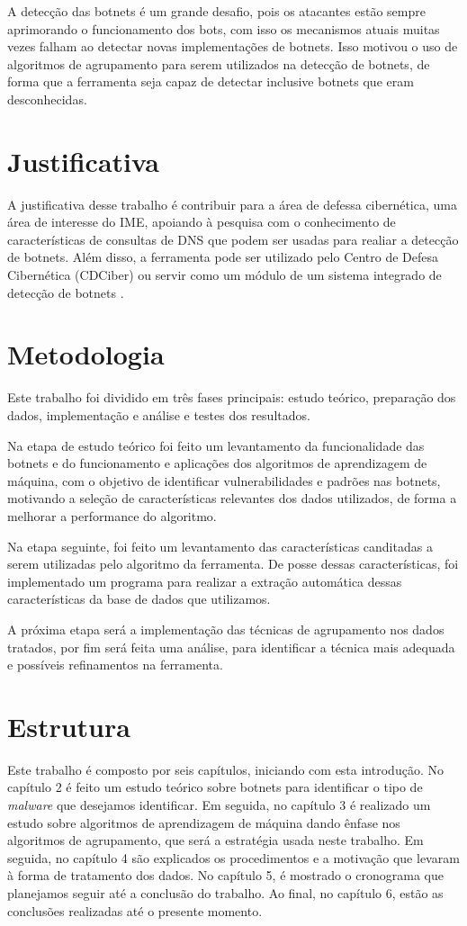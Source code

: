 A detecção das botnets é um grande desafio, pois os atacantes estão sempre aprimorando o funcionamento dos bots, com isso os mecanismos atuais muitas vezes falham ao detectar novas implementações de botnets. Isso motivou o uso de algoritmos de agrupamento para serem utilizados na detecção de botnets, de forma que a ferramenta seja capaz de detectar inclusive botnets que eram desconhecidas. 

\section{Justificativa}
A justificativa desse trabalho é contribuir para a área de defessa cibernética, uma área de interesse do IME, apoiando à pesquisa com o conhecimento de características de consultas de DNS que podem ser usadas para realiar a detecção de botnets. Além disso, a ferramenta pode ser utilizado pelo Centro de Defesa Cibernética (CDCiber) ou servir como um módulo de um sistema integrado de detecção de botnets \citep{silva2012arquitetura}.

\section{Metodologia}
Este trabalho foi dividido em três fases principais: estudo teórico, preparação dos dados, implementação e análise e testes dos resultados. 

Na etapa de estudo teórico foi feito um levantamento da funcionalidade das botnets e do funcionamento e aplicações dos algoritmos de aprendizagem de máquina, com o objetivo de identificar vulnerabilidades e padrões nas botnets, motivando a seleção de características relevantes dos dados utilizados, de forma a melhorar a performance do algoritmo.

Na etapa seguinte, foi feito um levantamento das características canditadas a serem utilizadas pelo algoritmo da ferramenta. De posse dessas características, foi implementado um programa para realizar a extração automática dessas características da base de dados que utilizamos.

A próxima etapa será a implementação das técnicas de agrupamento nos dados tratados, por fim será feita uma análise, para identificar a técnica mais adequada e possíveis refinamentos na ferramenta.

\section{Estrutura}
Este trabalho é composto por seis capítulos, iniciando com esta introdução. No capítulo 2 é feito um estudo teórico sobre botnets para identificar o tipo de \textit{malware} que desejamos identificar. Em seguida, no capítulo 3 é realizado um estudo sobre algoritmos de aprendizagem de máquina dando ênfase nos algoritmos de agrupamento, que será a estratégia usada neste trabalho. Em seguida, no capítulo 4 são explicados os procedimentos e a motivação que levaram à forma de tratamento dos dados. No capítulo 5, é mostrado o cronograma que planejamos seguir até a conclusão do trabalho. Ao final, no capítulo 6, estão as conclusões realizadas até o presente momento.